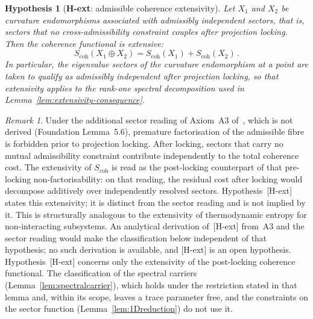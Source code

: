 \documentclass[pdflatex,sn-mathphys-num]{sn-jnl} %
\theoremstyle{remark}
\newtheorem*{remark}{Remark}
\theoremstyle{plain}
\newtheorem{hypothesis}{Hypothesis}
\begin{document}
    \begin{hypothesis}[\textbf{H-ext}: admissible coherence
    extensivity]\label{hyp:Hext}
      Let $X_1$ and $X_2$ be curvature endomorphisms
      associated with admissibly independent sectors, that is, sectors that no
      cross-admissibility constraint couples
      after projection locking.
      Then the coherence functional is extensive:
      \begin{equation}\label{eq:H-ext}
        S_{\mathrm{coh}}(X_1 \oplus X_2)
        =
        S_{\mathrm{coh}}(X_1) + S_{\mathrm{coh}}(X_2)\,.
      \end{equation}
      In particular, the eigenvalue sectors of the curvature
      endomorphism at a point are taken to qualify as
      admissibly independent after projection locking, so
      that extensivity applies to the rank-one spectral
      decomposition used in
      Lemma~\ref{lem:extensivity-consequence}.
    \end{hypothesis}

    \begin{remark}
      Under the additional sector reading of Axiom~A3 of~\cite{Beau2026m}, which is not derived (Foundation
      Lemma~5.6), premature factorisation of the admissible fibre is forbidden prior to projection locking.
      After locking, sectors that carry no mutual admissibility
      constraint contribute independently to the total
      coherence cost.
      The extensivity of $S_{\mathrm{coh}}$ is read as the post-locking
      counterpart of that pre-locking non-factorisability: on that reading, the
      residual cost after locking would decompose additively over
      independently resolved sectors.
      Hypothesis~[H-ext] states this extensivity; it is distinct from the sector reading and is not implied by
      it.
      This is structurally analogous to the extensivity of
      thermodynamic entropy for non-interacting subsystems.
      An analytical derivation of~[H-ext] from~A3 and the sector reading would
      make the classification below independent of that hypothesis; no such derivation is available, and
      [H-ext] is an open hypothesis.
      Hypothesis~[H-ext] concerns only the extensivity of the
      post-locking coherence functional.
      The classification of the spectral carriers (Lemma~\ref{lem:spectralcarrier}), which holds under the
      restriction stated in that lemma and, within its scope, leaves a trace parameter free, and the constraints on
      the sector function
      (Lemma~\ref{lem:1Dreduction}) do not use it.
    \end{remark}
\end{document}
